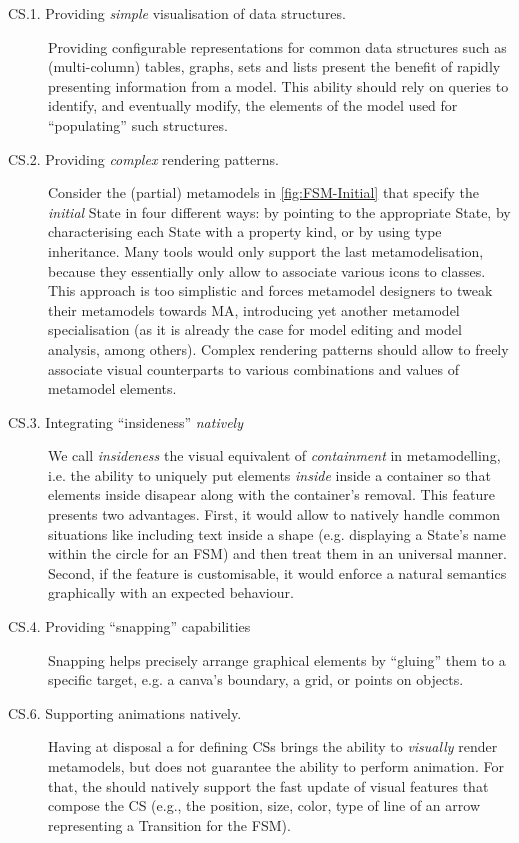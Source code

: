 \begin{description}
   \item[CS.1. Providing \emph{simple} visualisation of data struc\-tures.]
   Pro\-vi\-ding configurable representations for common data structures such as
   (multi-column) tables, graphs, sets and lists present the benefit of rapidly
   presenting information from a model. This ability should rely on queries to
   identify, and eventually modify, the elements of the model used for ``populating''
   such structures. 

	\item[CS.2. Providing \emph{complex} rendering patterns.]
   Consider the (partial) meta\-models in \autoref{fig:FSM-Initial} that
   specify the \emph{initial} \textsf{State} in four different ways: by pointing
   to the appropriate \textsf{State}, by characterising each \textsf{State} with
   a property \textsf{kind}, or by using type inheritance. Many tools would only
   support the last metamodelisation, because they essentially only allow to 
   associate various icons to classes. This approach is too simplistic and forces
   metamodel designers to tweak their metamodels towards MA, introducing yet another
   metamodel specialisation (as it is already the case for model editing and
   model analysis, among others). Complex rendering patterns should allow to freely
   associate visual counterparts to various combinations and values of metamodel
   elements.
   
   \item[CS.3. Integrating ``insideness'' \emph{natively}] We call \emph{insideness}
   the visual equivalent of \emph{containment} in metamodelling, i.e. the ability
   to uniquely put elements \emph{inside} inside a container so that elements 
   inside disapear along with the container's removal. This feature presents two
   advantages. First, it would allow to natively handle common situations like 
   including text inside a shape (e.g. displaying a \textsf{State}'s name within
   the circle for an \textsf{FSM}) and then treat them in an universal manner. 
   Second, if the feature is customisable, it would enforce a natural semantics
   graphically with an expected behaviour. 
   
   \item[CS.4. Providing ``snapping'' capabilities] Snapping helps precise\-ly arrange
   graphical elements by ``gluing'' them to a specific target, e.g. a canva's
   boundary, a grid, or points on objects. 
      
   \item[CS.6. Supporting animations natively.] Having at disposal a \DSL
   for defining CSs brings the ability to \emph{visually} render metamodels, but
   does not guarantee the ability to perform animation. For that, the \DSL should
   natively support the fast update of visual features that compose the CS (e.g.,
   the position, size, color, type of line of an arrow representing a 
   \textsf{Transition} for the \textsf{FSM}).      
\end{description}


